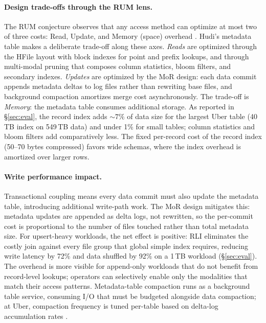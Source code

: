 \documentclass[sigconf]{acmart}
\begin{document}
\paragraph{Design trade-offs through the RUM lens.}
The RUM conjecture observes that any access method can optimize at most two of three costs: Read, Update, and Memory (space) overhead \cite{athanassoulis2016rum}.
Hudi's metadata table makes a deliberate trade-off along these axes.
\emph{Reads} are optimized through the HFile layout with block indexes for point and prefix lookups, and through multi-modal pruning that composes column statistics, bloom filters, and secondary indexes.
\emph{Updates} are optimized by the MoR design: each data commit appends metadata deltas to log files rather than rewriting base files, and background compaction amortizes merge cost asynchronously.
The trade-off is \emph{Memory}: the metadata table consumes additional storage.
As reported in \S\ref{sec:eval}, the record index adds ${\sim}7\%$ of data size for the largest Uber table (40\,TB index on 549\,TB data) and under 1\% for small tables; column statistics and bloom filters add comparatively less.
The fixed per-record cost of the record index (50--70 bytes compressed) favors wide schemas, where the index overhead is amortized over larger rows.

\paragraph{Write performance impact.}
Transactional coupling means every data commit must also update the metadata table, introducing additional write-path work.
The MoR design mitigates this: metadata updates are appended as delta logs, not rewritten, so the per-commit cost is proportional to the number of files touched rather than total metadata size.
For upsert-heavy workloads, the net effect is positive: RLI eliminates the costly join against every file group that global simple index requires, reducing write latency by 72\% and data shuffled by 92\% on a 1\,TB workload (\S\ref{sec:eval}).
The overhead is more visible for append-only workloads that do not benefit from record-level lookups; operators can selectively enable only the modalities that match their access patterns.
Metadata-table compaction runs as a background table service, consuming I/O that must be budgeted alongside data compaction; at Uber, compaction frequency is tuned per-table based on delta-log accumulation rates \cite{uber-hudi-blog}.
\end{document}
